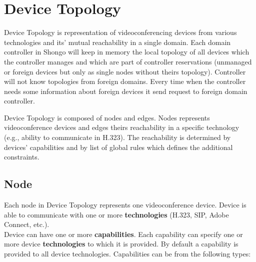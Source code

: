 \CodeStyle{} 
\CodeStyleAppendImplementation
\CodeStyleAppendEnum

\chapter{Device Topology}

Device Topology is representation of videoconferencing devices from various 
technologies and its' mutual reachability in a single domain. Each domain 
controller in Shongo will keep in memory the local topology of all devices 
which the controller manages and which are part of controller reservations 
(unmanaged or foreign devices but only as single nodes without theirs 
topology).
Controller will not know topologies from foreign domains. Every time when the 
controller needs some information about foreign devices it send request to 
foreign domain controller.

Device Topology is composed of nodes and edges. Nodes represents 
videoconference devices and edges theirs reachability in a specific technology 
(e.g., ability to communicate in H.323). The reachability is determined by 
devices' capabilities and by list of global rules which defines the additional 
constraints.

\section{Node}

Each node in Device Topology represents one videoconference device. Device is 
able to communicate with one or more \textbf{technologies} (H.323, SIP, Adobe 
Connect, etc.).
\\
Device can have one or more \textbf{capabilities}. Each capability can specify 
one or more device \textbf{technologies} to which it is provided. By default a capability is provided to all device technologies. Capabilities 
can be from the following types:

